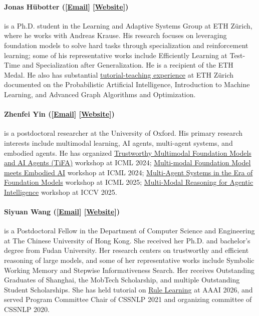 \paragraph{Jonas H{\"u}botter ([\href{mailto:jhuebotter@ethz.ch}{Email}] [\href{https://jonhue.github.io/}{Website}])}
is a Ph.D. student in the Learning and Adaptive Systems Group at ETH Z{\"u}rich, where he works with Andreas Krause. His research focuses on leveraging foundation models to solve hard tasks through specialization and reinforcement learning; some of his representative works include Efficiently Learning at Test-Time and Specialization after Generalization. He is a recipient of the ETH Medal. He also has substantial \href{https://jonhue.github.io/teaching/}{tutorial-teaching experience} at ETH Z{\"u}rich documented on the Probabilistic Artificial Intelligence, Introduction to Machine Learning, and Advanced Graph Algorithms and Optimization.

\paragraph{Zhenfei Yin ([\href{mailto:jeremyyin@robots.ox.ac.uk}{Email}] [\href{https://yinzhenfei.github.io/}{Website}])}
is a postdoctoral researcher at the University of Oxford. His primary research interests include multimodal learning, AI agents, multi-agent systems, and embodied agents. He has organized \href{https://icml-tifa.github.io/}{Trustworthy Multimodal Foundation Models and AI Agents (TiFA)} workshop at ICML 2024; \href{https://icml-mfm-eai.github.io/}{Multi-modal Foundation Model meets Embodied AI} workshop at ICML 2024; \href{https://mas-2025.github.io/MAS-2025/}{Multi-Agent Systems in the Era of Foundation Models} workshop at ICML 2025; \href{https://agent-intelligence.github.io/agent-intelligence/}{Multi-Modal Reasoning for Agentic Intelligence} workshop at ICCV 2025.

\paragraph{Siyuan Wang ([\href{mailto:siyuanwang1997@gmail.com}{Email}] [\href{https://siyuanwangw.github.io/}{Website}])}
is a Postdoctoral Fellow in the Department of Computer Science and Engineering at The Chinese University of Hong Kong. She received her Ph.D. and bachelor’s degree from Fudan University. Her research centers on trustworthy and efficient reasoning of large models, and some of her representative works include Symbolic Working Memory and Stepwise Informativeness Search. Her receives Outstanding Graduates of Shanghai, the MobTech Scholarship, and multiple Outstanding Student Scholarships. She has held tutorial on \href{https://github.com/golsun/rule_learning/blob/main/AAAI%20Rule%20Learning%20Tutorial.pdf}{Rule Learning} at AAAI 2026, and served Program Committee Chair of CSSNLP 2021 and organizing committee of CSSNLP 2020.


